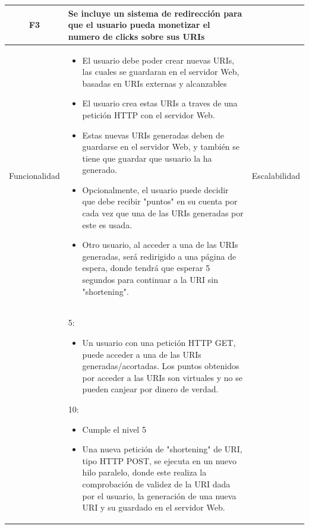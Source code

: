\documentclass{article}
\begin{document}
\begin{table}[hbtp]
    \footnotesize
    \centering
    \settowidth{}
    \setlength\extrarowheight{5pt}
    \begin{tabulary}{\textwidth}{ C L }
        \textbf{F3} & Se incluye un sistema de redirección para que el usuario pueda monetizar el numero de clicks sobre sus URIs
        \\
    \hline
    
    Funcionalidad &
    \begin{itemize}
        \item El usuario debe poder crear nuevas URIs, las cuales se guardaran en el servidor Web, basadas en URIs externas y alcanzables

        \item El usuario crea estas URIs a traves de una petición HTTP con el servidor Web.

        \item Estas nuevas URIs generadas deben de guardarse en el servidor Web, y también se tiene que guardar que usuario la ha generado.

        \item Opcionalmente, el usuario puede decidir que debe recibir "puntos" en su cuenta por cada vez que una de las URIs generadas por este es usada.

        \item Otro usuario, al acceder a una de las URIs generadas, será redirigido a una página de espera, donde tendrá que esperar 5 segundos para continuar a la URI sin "shortening".
    \end{itemize} &
        
    Escalabilidad\\ &
    5:
    \begin{itemize}
        \item Un usuario con una petición HTTP GET, puede acceder a una de las URIs generadas/acortadas. Los puntos obtenidos por acceder a las URIs son virtuales y no se pueden canjear por dinero de verdad.
        
    \end{itemize} 
    10:
    \begin{itemize}
        \item Cumple el nivel 5
		
		\item Una nueva petición de "shortening" de URI, tipo HTTP POST, se ejecuta en un nuevo hilo paralelo, donde este realiza la comprobación de validez de la URI dada por el usuario, la generación de una nueva URI y su guardado en el servidor Web.
		

\end{itemize}
\end{tabulary}
\end{table}
\end{document}
